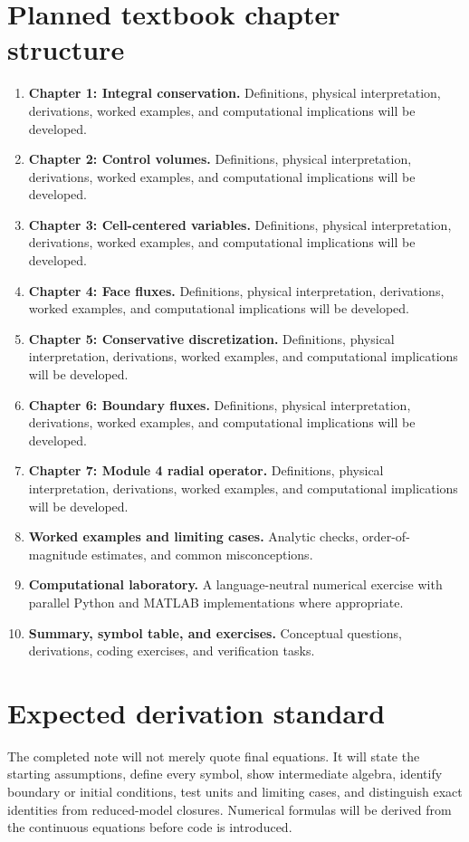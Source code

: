 \documentclass[11pt]{article}
\begin{document}
\section{Planned textbook chapter structure}
\begin{enumerate}[leftmargin=1.8em]
\item \textbf{Chapter 1: Integral conservation.} Definitions, physical interpretation, derivations, worked examples, and computational implications will be developed.
\item \textbf{Chapter 2: Control volumes.} Definitions, physical interpretation, derivations, worked examples, and computational implications will be developed.
\item \textbf{Chapter 3: Cell-centered variables.} Definitions, physical interpretation, derivations, worked examples, and computational implications will be developed.
\item \textbf{Chapter 4: Face fluxes.} Definitions, physical interpretation, derivations, worked examples, and computational implications will be developed.
\item \textbf{Chapter 5: Conservative discretization.} Definitions, physical interpretation, derivations, worked examples, and computational implications will be developed.
\item \textbf{Chapter 6: Boundary fluxes.} Definitions, physical interpretation, derivations, worked examples, and computational implications will be developed.
\item \textbf{Chapter 7: Module 4 radial operator.} Definitions, physical interpretation, derivations, worked examples, and computational implications will be developed.
\item \textbf{Worked examples and limiting cases.} Analytic checks, order-of-magnitude estimates, and common misconceptions.
\item \textbf{Computational laboratory.} A language-neutral numerical exercise with parallel Python and MATLAB implementations where appropriate.
\item \textbf{Summary, symbol table, and exercises.} Conceptual questions, derivations, coding exercises, and verification tasks.
\end{enumerate}

\section{Expected derivation standard}
The completed note will not merely quote final equations. It will state the starting assumptions, define every symbol, show intermediate algebra, identify boundary or initial conditions, test units and limiting cases, and distinguish exact identities from reduced-model closures. Numerical formulas will be derived from the continuous equations before code is introduced.
\end{document}
